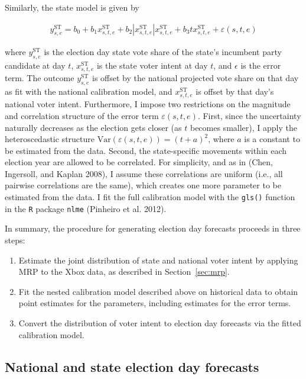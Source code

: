 Similarly, the state model is given by

\begin{align*}
  y_{s,e}^{\text{ST}}=b_0+b_1 x_{s,t,e}^{\text{ST}}+
  b_2|x_{s,t,e}^{\text{ST}}|x_{s,t,e}^{\text{ST}} +
  b_3tx_{s,t,e}^{\text{ST}} + \varepsilon(s,t,e)
\end{align*}

where \(y_{s,e}^{\text{ST}}\) is the election day state vote share of
the state's incumbent party candidate at day \(t\),
\(x_{s,t,e}^{\text{ST}}\) is the state voter intent at day \(t\), and
\(\epsilon\) is the error term. The outcome \(y_{s,e}^{\text{ST}}\) is
offset by the national projected vote share on that day as fit with the
national calibration model, and \(x_{s,t,e}^{\text{ST}}\) is offset by
that day's national voter intent. Furthermore, I impose two restrictions
on the magnitude and correlation structure of the error term
\(\varepsilon(s,t,e)\). First, since the uncertainty naturally decreases
as the election gets closer (as \(t\) becomes smaller), I apply the
heteroscedastic structure \(\text{Var}(\varepsilon(s,t,e))=(t+a)^2\),
where \(a\) is a constant to be estimated from the data. Second, the
state-specific movements within each election year are allowed to be
correlated. For simplicity, and as in (Chen, Ingersoll, and Kaplan
2008), I assume these correlations are uniform (i.e., all pairwise
correlations are the same), which creates one more parameter to be
estimated from the data. I fit the full calibration model with the
\texttt{gls()} function in the \texttt{R} package \texttt{nlme}
(Pinheiro et al. 2012).

In summary, the procedure for generating election day forecasts proceeds
in three steps:

\begin{enumerate}
\item Estimate the joint distribution of state and national voter intent by applying MRP to the Xbox data,
as described in Section~\ref{sec:mrp}.
\item Fit the nested calibration model described above on historical data to obtain point estimates for the parameters, including
estimates for the error terms.
\item Convert the distribution of voter intent to election day forecasts via the fitted calibration model.
\end{enumerate}

\subsection{National and state election day
forecasts}\label{national-and-state-election-day-forecasts}


